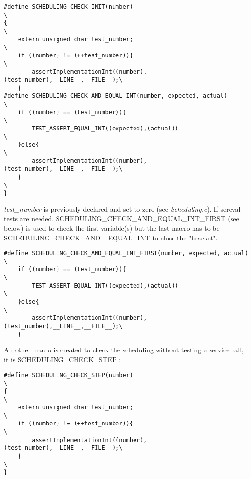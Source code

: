 \documentclass[10pt]{article}
\begin{document}
	\begin{lstlisting}
#define SCHEDULING_CHECK_INIT(number)									         \
{																				 	         \
	extern unsigned char test_number;									         \
	if ((number) != (++test_number)){									         \
		assertImplementationInt((number),(test_number),__LINE__,__FILE__);\
	}	
#define SCHEDULING_CHECK_AND_EQUAL_INT(number, expected, actual)        \
	if ((number) == (test_number)){										         \
		TEST_ASSERT_EQUAL_INT((expected),(actual))					         \
	}else{															                  \
		assertImplementationInt((number),(test_number),__LINE__,__FILE__);\
	}																                     \
}
	\end{lstlisting} 
	
	\textit{test\_number} is previously declared and set to zero (see \textit{Scheduling.c}).
	If sereval tests are needed, SCHEDULING\_CHECK\_AND\_EQUAL\_INT\_FIRST (see below) is used to check the first variable(s) but the last macro has to be SCHEDULING\_CHECK\_AND\_ EQUAL\_INT to close the "bracket".
	
	\begin{lstlisting}
#define SCHEDULING_CHECK_AND_EQUAL_INT_FIRST(number, expected, actual)  \
	if ((number) == (test_number)){										         \
		TEST_ASSERT_EQUAL_INT((expected),(actual))					         \
	}else{															                  \
		assertImplementationInt((number),(test_number),__LINE__,__FILE__);\
	}
	\end{lstlisting} 
	
	An other macro is created to check the scheduling without testing a service call, it is SCHEDULING\_CHECK\_STEP :
	\begin{lstlisting}
#define SCHEDULING_CHECK_STEP(number)									         \
{																	                     \
	extern unsigned char test_number;								            \
	if ((number) != (++test_number)){								            \
		assertImplementationInt((number),(test_number),__LINE__,__FILE__);\
	}															                        \
}
	\end{lstlisting}
\end{document}
